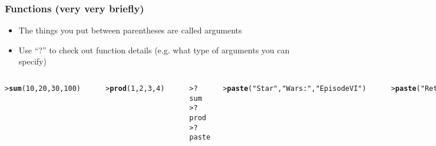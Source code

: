 \documentclass[13pt,aspectratio=169]{beamer}\usepackage[]{graphicx}\usepackage[]{color}
\makeatletter
\newcommand{\hlnum}[1]{\textcolor[rgb]{0.686,0.059,0.569}{#1}}%
\newcommand{\hlstr}[1]{\textcolor[rgb]{0.192,0.494,0.8}{#1}}%
\newcommand{\hlopt}[1]{\textcolor[rgb]{0,0,0}{#1}}%
\newcommand{\hlstd}[1]{\textcolor[rgb]{0.345,0.345,0.345}{#1}}%
\newcommand{\hlkwd}[1]{\textcolor[rgb]{0.737,0.353,0.396}{\textbf{#1}}}%
\newenvironment{kframe}{%
 \def\at@end@of@kframe{}%
 \ifinner\ifhmode%
  \def\at@end@of@kframe{\end{minipage}}%
  \begin{minipage}{\columnwidth}%
 \fi\fi%
 \def\FrameCommand##1{\hskip\@totalleftmargin \hskip-\fboxsep
 \colorbox{shadecolor}{##1}\hskip-\fboxsep
     \hskip-\linewidth \hskip-\@totalleftmargin \hskip\columnwidth}%
 \MakeFramed {\advance\hsize-\width
   \@totalleftmargin\z@ \linewidth\hsize
   \@setminipage}}%
 {\par\unskip\endMakeFramed%
 \at@end@of@kframe}
\newenvironment{knitrout}{}{} %
\renewenvironment{knitrout}{\setlength{\topsep}{0mm}}{}
\makeatother
\begin{document}
\begin{frame}[fragile]
    \frametitle{Functions (very very briefly)}
    \begin{itemize}
	\item The things you put between parentheses are called arguments
	\item Use ``?'' to check out function details (e.g. what type of
	    arguments you can specify)
    \end{itemize}
    \begin{columns}[t]
\begin{knitrout}\small
{}\color{fgcolor}\begin{kframe}
\begin{alltt}
\hlstd{> }\hlkwd{sum}\hlstd{(}\hlnum{10}\hlstd{,} \hlnum{20}\hlstd{,} \hlnum{30}\hlstd{,} \hlnum{100}\hlstd{)}
\end{alltt}
\begin{verbatim}
[1] 160
\end{verbatim}
\begin{alltt}
\hlstd{> }\hlkwd{prod}\hlstd{(}\hlnum{1}\hlstd{,} \hlnum{2}\hlstd{,} \hlnum{3}\hlstd{,} \hlnum{4}\hlstd{)}
\end{alltt}
\begin{verbatim}
[1] 24
\end{verbatim}
\end{kframe}
\end{knitrout}

\begin{knitrout}\small
{}\color{fgcolor}\begin{kframe}
\begin{alltt}
\hlstd{> }\hlopt{?}\hlstd{sum}
\hlstd{> }\hlopt{?}\hlstd{prod}
\hlstd{> }\hlopt{?}\hlstd{paste}
\end{alltt}
\end{kframe}
\end{knitrout}
\begin{knitrout}\small
{}\color{fgcolor}\begin{kframe}
\begin{alltt}
\hlstd{> }\hlkwd{paste}\hlstd{(}\hlstr{"Star"}\hlstd{,} \hlstr{"Wars:"}\hlstd{,} \hlstr{"Episode VI"}\hlstd{)}
\end{alltt}
\begin{verbatim}
[1] "Star Wars: Episode VI"
\end{verbatim}
\begin{alltt}
\hlstd{> }\hlkwd{paste}\hlstd{(}\hlstr{"Return of"}\hlstd{,} \hlstr{"the Jedi"}\hlstd{)}
\end{alltt}
\begin{verbatim}
[1] "Return of the Jedi"
\end{verbatim}
\end{kframe}
\end{knitrout}
    \end{columns}
\end{frame}
\end{document}
